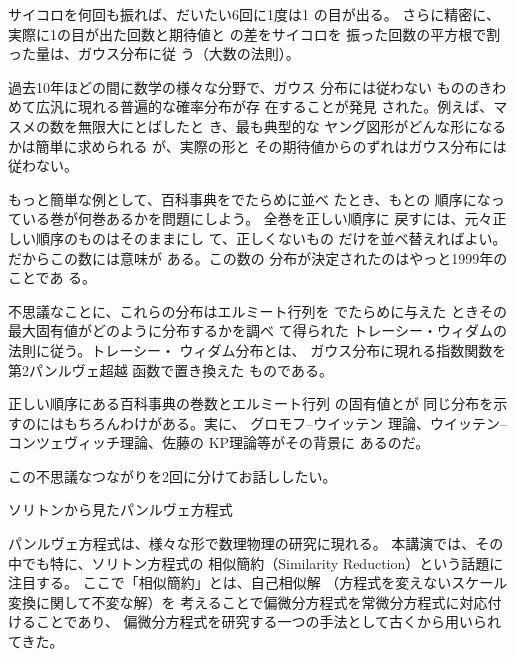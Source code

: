 \documentclass[uplatex,dvipdfmx]{jlreq}
\begin{document}
\vspace*{18pt}

サイコロを何回も振れば、だいたい6回に1度は1
の目が出る。
さらに精密に、実際に1の目が出た回数と期待値と
の差をサイコロを
振った回数の平方根で割った量は、ガウス分布に従
う（大数の法則）。

過去10年ほどの間に数学の様々な分野で、ガウス
分布には従わない
もののきわめて広汎に現れる普遍的な確率分布が存
在することが発見
された。例えば、マスメの数を無限大にとばしたと
き、最も典型的な
ヤング図形がどんな形になるかは簡単に求められる
が、実際の形と
その期待値からのずれはガウス分布には従わない。

もっと簡単な例として、百科事典をでたらめに並べ
たとき、もとの
順序になっている巻が何巻あるかを問題にしよう。
全巻を正しい順序に
戻すには、元々正しい順序のものはそのままにし
て、正しくないもの
だけを並べ替えればよい。だからこの数には意味が
ある。この数の
分布が決定されたのはやっと1999年のことであ
る。

不思議なことに、これらの分布はエルミート行列を
でたらめに与えた
ときその最大固有値がどのように分布するかを調べ
て得られた
トレーシー・ウィダムの法則に従う。トレーシー・
ウィダム分布とは、
ガウス分布に現れる指数関数を第2パンルヴェ超越
函数で置き換えた
ものである。

正しい順序にある百科事典の巻数とエルミート行列
の固有値とが
同じ分布を示すのにはもちろんわけがある。実に、
グロモフ--ウイッテン
理論、ウイッテン--コンツェヴィッチ理論、佐藤の
KP理論等がその背景に
あるのだ。

この不思議なつながりを2回に分けてお話ししたい。

\vspace*{24pt}

\newpage


\begin{center}
ソリトンから見たパンルヴェ方程式\\[6pt]
\hspace*{\fill}{\large\bfseries 筧　三郎（立教大・理）}
\end{center}

\vspace*{18pt}

パンルヴェ方程式は、様々な形で数理物理の研究に現れる。
本講演では、その中でも特に、ソリトン方程式の
相似簡約（Similarity Reduction）という話題に注目する。
ここで「相似簡約」とは、自己相似解
（方程式を変えないスケール変換に関して不変な解）を
考えることで偏微分方程式を常微分方程式に対応付けることであり、
偏微分方程式を研究する一つの手法として古くから用いられてきた。
\end{document}
